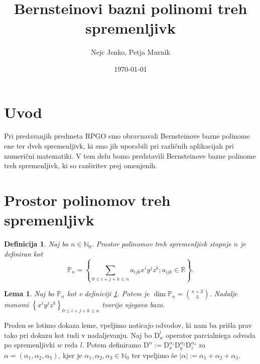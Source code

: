 \documentclass[11pt,a4paper]{article}
\title{\textbf{Bernsteinovi bazni polinomi treh spremenljivk}}
\author{Nejc Jenko, Petja Murnik}
\date{\today}
\newtheorem{definition}{Definicija}
\newtheorem{lemma}{Lema}
\begin{document}
\maketitle
\break

\section{Uvod}

Pri predavanjih predmeta RPGO smo obravnavali Bernsteinove bazne polinome ene
ter dveh spremenljivk, ki smo jih uporabili pri različnih aplikacijah pri numerični matematiki.
V tem delu bomo predstavili Bernsteinove bazne polinome treh spremenljivk, ki so 
razširitev prej omenjenih. 

\section{Prostor polinomov treh spremenljivk} 

\begin{definition}\label{def_prostor}
    Naj bo $n \in \mathbb{N}_0$. Prostor polinomov treh spremenljivk stopnje $n$ je definiran kot
    \begin{equation}
        \mathbb{P}_n = \left\{ \sum_{0 \le i  + j + k \le n} a_{ijk} x^i y^j z^k  ; a_{ijk} \in \mathbb{R}\right\}.
    \end{equation}
\end{definition}

\begin{lemma}
    Naj bo $\mathbb{P}_n$ kot v definiciji \ref{def_prostor}.
    Potem je $\dim \mathbb{P}_n = \binom{n+3}{3} $. 
    Nadalje monomi $\left\{x^i y^j z^k \right\}_{0 \le i  + j + k \le n}$ tvorijo njegovo bazo.
\end{lemma}

Preden se lotimo dokaza leme, vpeljimo noticajo odvodov, 
ki nam ba prišla prav tako pri dokazu kot tudi 
v nadaljevanju. Naj bo $\text{D}^l_w$ operator parcialniega odvoda po
spremenljivki $w$ reda $l$. Potem definiramo 
$\text{D}^\alpha := \text{D}^{\alpha_1}_x \text{D}^{\alpha_2}_y \text{D}^{\alpha_3}_z$
za $\alpha = \left(\alpha_1 , \alpha_2 , \alpha_3 \right)$,
kjer je $\alpha_1,\alpha_2, \alpha_3 \in \mathbb{N}_0$ 
ter vpeljimo še $|\alpha| := \alpha_1 + \alpha_2 + \alpha_3$.
\end{document}
